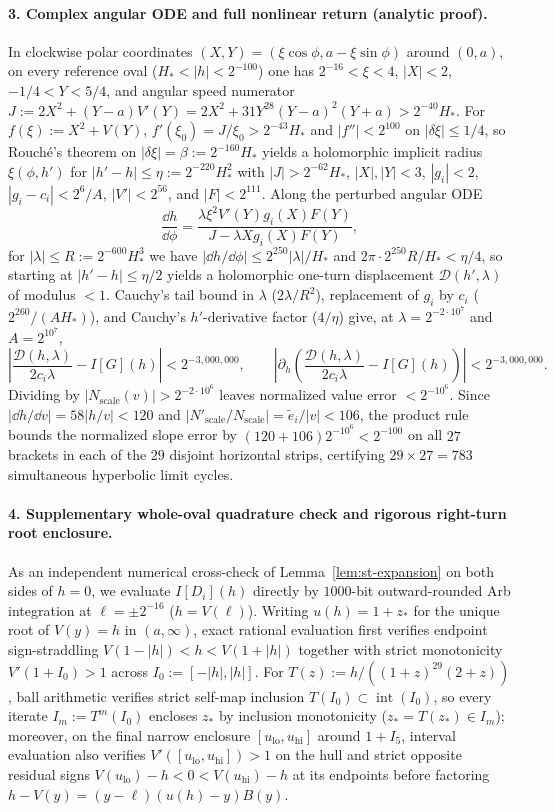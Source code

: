 \paragraph{3. Complex angular ODE and full nonlinear return (analytic proof).}
In clockwise polar coordinates $(X,Y)=(\xi\cos\phi,a-\xi\sin\phi)$ around $(0,a)$, on every reference oval ($H_*<|h|<2^{-100}$) one has $2^{-16}<\xi<4$, $|X|<2$, $-1/4<Y<5/4$, and angular speed numerator $J:=2X^2+(Y-a)V'(Y)=2X^2+31Y^{28}(Y-a)^2(Y+a)>2^{-40}H_*$. For $f(\xi):=X^2+V(Y)$, $f'(\xi_0)=J/\xi_0>2^{-43}H_*$ and $|f''|<2^{100}$ on $|\delta\xi|\le 1/4$, so Rouch\'e's theorem on $|\delta\xi|=\beta:=2^{-160}H_*$ yields a holomorphic implicit radius $\xi(\phi,h')$ for $|h'-h|\le\eta:=2^{-220}H_*^2$ with $|J|>2^{-62}H_*$, $|X|,|Y|<3$, $|g_i|<2$, $|g_i-c_i|<2^6/A$, $|V'|<2^{56}$, and $|F|<2^{111}$. Along the perturbed angular ODE
\[
  \frac{\dd h}{\dd\phi} = \frac{\lambda\xi^2 V'(Y)g_i(X)F(Y)}{J - \lambda X g_i(X)F(Y)},
\]
for $|\lambda|\le R:=2^{-600}H_*^3$ we have $|\dd h/\dd\phi|\le 2^{250}|\lambda|/H_*$ and $2\pi\cdot 2^{250}R/H_*<\eta/4$, so starting at $|h'-h|\le\eta/2$ yields a holomorphic one-turn displacement $\mathcal{D}(h',\lambda)$ of modulus $<1$. Cauchy's tail bound in $\lambda$ ($2\lambda/R^2$), replacement of $g_i$ by $c_i$ ($2^{260}/(A H_*)$), and Cauchy's $h'$-derivative factor ($4/\eta$) give, at $\lambda=2^{-2\cdot 10^7}$ and $A=2^{10^7}$,
\[
  \left|\frac{\mathcal{D}(h,\lambda)}{2c_i\lambda} - I[G](h)\right| < 2^{-3{,}000{,}000}, \qquad
  \left|\partial_h\!\left(\frac{\mathcal{D}(h,\lambda)}{2c_i\lambda} - I[G](h)\right)\right| < 2^{-3{,}000{,}000}.
\]
Dividing by $|N_{\mathrm{scale}}(v)|>2^{-2\cdot 10^6}$ leaves normalized value error $<2^{-10^6}$. Since $|\dd h/\dd v|=58|h/v|<120$ and $|N'_{\mathrm{scale}}/N_{\mathrm{scale}}|=\tilde e_i/|v|<106$, the product rule bounds the normalized slope error by $(120+106)2^{-10^6}<2^{-100}$ on all $27$ brackets in each of the $29$ disjoint horizontal strips, certifying $29\times 27=783$ simultaneous hyperbolic limit cycles.

\paragraph{4. Supplementary whole-oval quadrature check and rigorous right-turn root enclosure.}
As an independent numerical cross-check of Lemma~\ref{lem:st-expansion} on both sides of $h=0$, we evaluate $I[D_i](h)$ directly by $1000$-bit outward-rounded Arb integration at $\ell=\pm 2^{-16}$ ($h=V(\ell)$). Writing $u(h)=1+z_*$ for the unique root of $V(y)=h$ in $(a,\infty)$, exact rational evaluation first verifies endpoint sign-straddling $V(1-|h|)<h<V(1+|h|)$ together with strict monotonicity $V'(1+I_0)>1$ across $I_0:=[-|h|,|h|]$. For $T(z):=h/((1+z)^{29}(2+z))$, ball arithmetic verifies strict self-map inclusion $T(I_0)\subset\operatorname{int}(I_0)$, so every iterate $I_m:=T^m(I_0)$ encloses $z_*$ by inclusion monotonicity ($z_*=T(z_*)\in I_m$); moreover, on the final narrow enclosure $[u_{\mathrm{lo}},u_{\mathrm{hi}}]$ around $1+I_5$, interval evaluation also verifies $V'([u_{\mathrm{lo}},u_{\mathrm{hi}}])>1$ on the hull and strict opposite residual signs $V(u_{\mathrm{lo}})-h<0<V(u_{\mathrm{hi}})-h$ at its endpoints before factoring $h-V(y)=(y-\ell)(u(h)-y)B(y)$.

